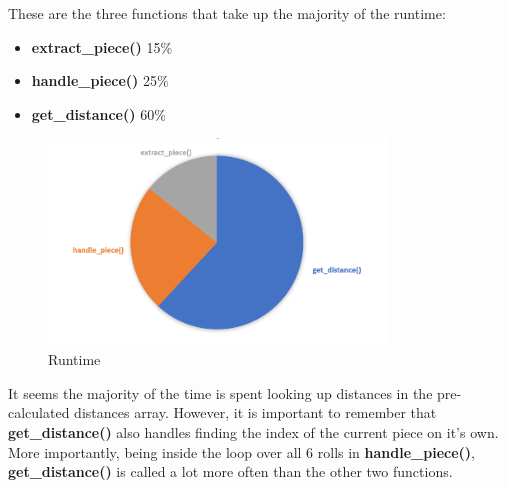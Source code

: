 \documentclass[12pt]{article}
\begin{document}
These are the three functions that take up the majority of the runtime:

\begin{itemize}
	\item \textbf{extract\_piece()} 15\%
	\item \textbf{handle\_piece()} 25\%
	\item \textbf{get\_distance()} 60\%
\end{itemize}

\begin{figure}[htbp]
    \centering
    \includegraphics[width=0.8\textwidth]{images/Figure16}
    \caption{Runtime}
    \label{fig:runtime-diagram}
\end{figure}

It seems the majority of the time is spent looking up distances in the pre-calculated distances array. However, it is important to remember that \textbf{get\_distance()} also handles finding the index of the current piece on it's own. More importantly, being inside the loop over all 6 rolls in \textbf{handle\_piece()}, \textbf{get\_distance()} is called a lot more often than the other two functions.
\end{document}
